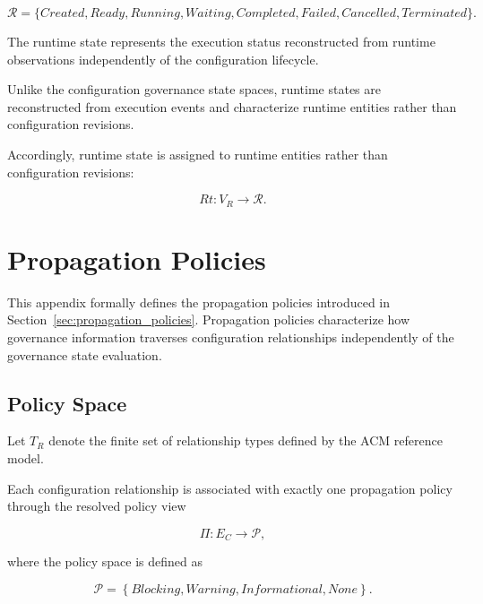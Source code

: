 \documentclass[10pt]{article}
\begin{document}
\begin{equation}
	\mathcal{R}=
	\{
	Created,
	Ready,
	Running,
	Waiting,
	Completed,
	Failed,
	Cancelled,
	Terminated
	\}.
	\label{eq:runtime_space}
\end{equation}

The runtime state represents the execution status reconstructed from runtime observations independently of the configuration lifecycle.

Unlike the configuration governance state spaces, runtime states are reconstructed from execution events and characterize runtime entities rather than configuration revisions.

Accordingly, runtime state is assigned to runtime entities rather than
configuration revisions:

\begin{equation}
	Rt:V_R\rightarrow\mathcal{R}.
	\label{eq:runtime_state_assignment}
\end{equation}

\section{Propagation Policies}
\label{appendix:propagation_policies}

This appendix formally defines the propagation policies introduced in Section~\ref{sec:propagation_policies}. Propagation policies characterize how governance information traverses configuration relationships independently of the governance state evaluation.

\subsection{Policy Space}

Let $T_R$ denote the finite set of relationship types defined by the ACM reference model.

Each configuration relationship is associated with exactly one propagation policy through the resolved policy view

\begin{equation}
	\Pi:E_C\rightarrow\mathcal P,
	\label{eq:policy_mapping_formal}
\end{equation}

where the policy space is defined as

\begin{equation}
	\mathcal{P}=
	\left\{
	\textit{Blocking},
	\textit{Warning},
	\textit{Informational},
	\textit{None}
	\right\}.
	\label{eq:policy_set}
\end{equation}
\end{document}
